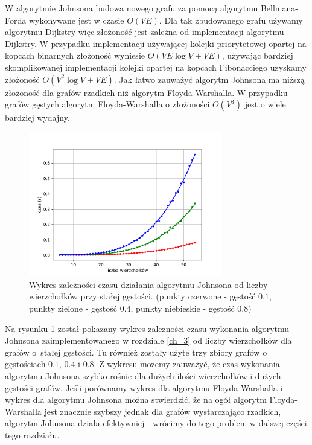 \documentclass[12pt,a4paper]{book}
\theoremstyle{definition}
\numberwithin{equation}{chapter}
\begin{document}
W algorytmie Johnsona budowa nowego grafu za pomocą algorytmu Bellmana-Forda wykonywane jest w czasie $O(VE)$. Dla tak zbudowanego grafu używamy algorytmu Dijkstry więc złożoność jest zależna od implementacji algorytmu Dijkstry. W przypadku implementacji używającej kolejki priorytetowej opartej na kopcach binarnych złożoność wyniesie $O(VE \log V + VE)$, używając bardziej skomplikowanej implementacji kolejki opartej na kopcach Fibonacciego uzyskamy złożoność $O(V^2 \log V + VE)$. Jak łatwo zauważyć algorytm Johnsona ma niższą złożoność dla grafów rzadkich niż algorytm Floyda-Warshalla. W przypadku grafów gęstych algorytm Floyda-Warshalla o złożoności $O(V^3)$ jest o wiele bardziej wydajny. 

\begin{figure}[H]
\centering
\includegraphics[width=0.75\textwidth]{images/Wykres_Johnson_gestosci.pdf}
\caption{Wykres zależności czasu działania algorytmu Johnsona od liczby wierzchołków przy stałej gęstości. (punkty czerwone - gęstość $0.1$, punkty zielone - gęstość $0.4$, punkty niebieskie - gęstość $0.8$)}
\label{rys_wykres_johnson_gestosci}
\end{figure}

Na rysunku \ref{rys_wykres_johnson_gestosci} został pokazany wykres zależności czasu wykonania algorytmu Johnsona zaimplementowanego w rozdziale \ref{ch_3} od liczby wierzchołków dla grafów o~stałej gęstości. Tu również zostały użyte trzy zbiory grafów o gęstościach $0.1$, $0.4$ i $0.8$. Z wykresu możemy zauważyć, że czas wykonania algorytmu Johnsona szybko rośnie dla dużych ilości wierzchołków i dużych gęstości grafów. Jeśli porównamy wykres dla algorytmu Floyda-Warshalla i wykres dla algorytmu Johnsona można stwierdzić, że na ogół algorytm Floyda-Warshalla jest znacznie szybszy jednak dla grafów wystarczająco rzadkich, algorytm Johnsona działa efektywniej - wrócimy do tego problem w dalszej części tego rozdziału.
\end{document}
